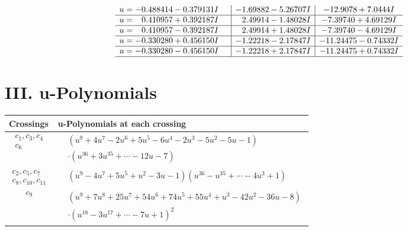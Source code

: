 \documentclass[1p]{elsarticle_modified}
\theoremstyle{definition}
\begin{document}
$$\begin{array}{c|c|c}
\begin{aligned}
u &= -0.488414 - 0.379131 I\end{aligned}
 & -1.69882 - 5.26707 I & -12.9078 + 7.0444 I \\ \hline\begin{aligned}
u &= \phantom{-}0.410957 + 0.392187 I\end{aligned}
 & \phantom{-}2.49914 - 1.48028 I & -7.39740 + 4.69129 I \\ \hline\begin{aligned}
u &= \phantom{-}0.410957 - 0.392187 I\end{aligned}
 & \phantom{-}2.49914 + 1.48028 I & -7.39740 - 4.69129 I \\ \hline\begin{aligned}
u &= -0.330280 + 0.456150 I\end{aligned}
 & -1.22218 - 2.17847 I & -11.24475 - 0.74332 I \\ \hline\begin{aligned}
u &= -0.330280 - 0.456150 I\end{aligned}
 & -1.22218 + 2.17847 I & -11.24475 + 0.74332 I\\
 \hline 
 \end{array}$$\newpage
\newpage\renewcommand{\arraystretch}{1}
\centering \section*{ III. u-Polynomials}
\begin{tabular}{m{50pt}|m{274pt}}
Crossings & \hspace{64pt}u-Polynomials at each crossing \\
\hline $$\begin{aligned}c_{1},c_{3},c_{4}\\c_{6}\end{aligned}$$&$\begin{aligned}
&(u^9+4 u^7-2 u^6+5 u^5-6 u^4-2 u^3-5 u^2-5 u-1)\\
&\cdot(u^{36}+3 u^{35}+\cdots-12 u-7)
\end{aligned}$\\
\hline $$\begin{aligned}c_{2},c_{5},c_{7}\\c_{8},c_{10},c_{11}\end{aligned}$$&$\begin{aligned}
&(u^9-4 u^7+5 u^5+u^2-3 u-1)(u^{36}- u^{35}+\cdots-4 u^3+1)
\end{aligned}$\\
\hline $$\begin{aligned}c_{9}\end{aligned}$$&$\begin{aligned}
&(u^9+7 u^8+25 u^7+54 u^6+74 u^5+55 u^4+u^3-42 u^2-36 u-8)\\
&\cdot(u^{18}-3 u^{17}+\cdots-7 u+1)^{2}
\end{aligned}$\\
\hline
\end{tabular}\newpage\renewcommand{\arraystretch}{1}
\end{document}
